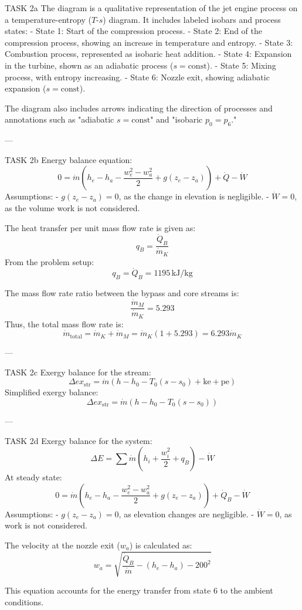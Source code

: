 TASK 2a  
The diagram is a qualitative representation of the jet engine process on a temperature-entropy (\( T \)-\( s \)) diagram. It includes labeled isobars and process states:  
- State 1: Start of the compression process.  
- State 2: End of the compression process, showing an increase in temperature and entropy.  
- State 3: Combustion process, represented as isobaric heat addition.  
- State 4: Expansion in the turbine, shown as an adiabatic process (\( s = \text{const} \)).  
- State 5: Mixing process, with entropy increasing.  
- State 6: Nozzle exit, showing adiabatic expansion (\( s = \text{const} \)).  

The diagram also includes arrows indicating the direction of processes and annotations such as "adiabatic \( s = \text{const} \)" and "isobaric \( p_0 = p_6 \)."  

---

TASK 2b  
Energy balance equation:  
\[
0 = \dot{m} \left( h_e - h_a - \frac{w_e^2 - w_a^2}{2} + g(z_e - z_a) \right) + \dot{Q} - \dot{W}
\]  
Assumptions:  
- \( g(z_e - z_a) = 0 \), as the change in elevation is negligible.  
- \( \dot{W} = 0 \), as the volume work is not considered.  

The heat transfer per unit mass flow rate is given as:  
\[
q_B = \frac{\dot{Q}_B}{\dot{m}_K}
\]  
From the problem setup:  
\[
q_B = \dot{Q}_B = 1195 \, \text{kJ/kg}
\]  

The mass flow rate ratio between the bypass and core streams is:  
\[
\frac{\dot{m}_M}{\dot{m}_K} = 5.293
\]  
Thus, the total mass flow rate is:  
\[
\dot{m}_{\text{total}} = \dot{m}_K + \dot{m}_M = \dot{m}_K \left( 1 + 5.293 \right) = 6.293 \dot{m}_K
\]  

---

TASK 2c  
Exergy balance for the stream:  
\[
\Delta ex_{\text{str}} = \dot{m} \left( h - h_0 - T_0 (s - s_0) + \text{ke} + \text{pe} \right)
\]  
Simplified exergy balance:  
\[
\Delta ex_{\text{str}} = \dot{m} \left( h - h_0 - T_0 (s - s_0) \right)
\]  

---

TASK 2d  
Exergy balance for the system:  
\[
\Delta E = \sum \dot{m} \left( h_i + \frac{w_i^2}{2} + q_B \right) - \dot{W}
\]  
At steady state:  
\[
0 = \dot{m} \left( h_e - h_a - \frac{w_e^2 - w_a^2}{2} + g(z_e - z_a) \right) + \dot{Q}_B - \dot{W}
\]  
Assumptions:  
- \( g(z_e - z_a) = 0 \), as elevation changes are negligible.  
- \( \dot{W} = 0 \), as work is not considered.  

The velocity at the nozzle exit (\( w_a \)) is calculated as:  
\[
w_a = \sqrt{\frac{\dot{Q}_B}{\dot{m}} - (h_e - h_a) - 200^2}
\]  

This equation accounts for the energy transfer from state 6 to the ambient conditions.